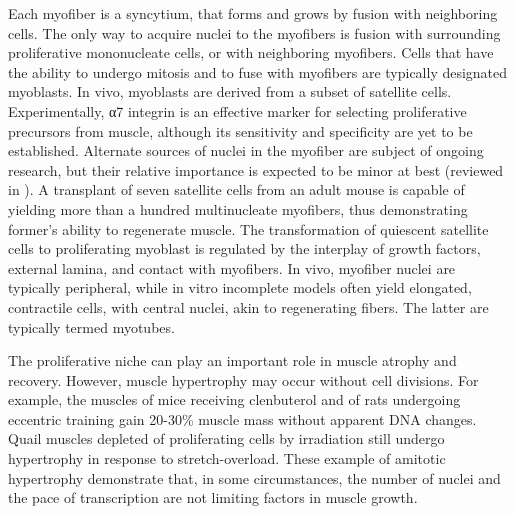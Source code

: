 \documentclass[12pt,english]{report}\usepackage[]{graphicx}\usepackage[]{color}
\begin{document}
Each myofiber is a syncytium, that forms and grows by fusion with
neighboring cells. The only way to acquire nuclei to the myofibers
is fusion with surrounding proliferative mononucleate cells, or with
neighboring myofibers. Cells that have the ability to undergo mitosis
and to fuse with myofibers are typically designated myoblasts. In
vivo, myoblasts are derived from a subset of satellite cells. Experimentally,
α7 integrin is an effective marker for selecting proliferative precursors
from muscle\citep{blanco-bose2001purification}, although its sensitivity
and specificity are yet to be established. Alternate sources of nuclei
in the myofiber are subject of ongoing research, but their relative
importance is expected to be minor at best (reviewed in \citep{yin2013satellite}).
A transplant of seven satellite cells from an adult mouse is capable
of yielding more than a hundred multinucleate myofibers, thus demonstrating
former's ability to regenerate muscle\citep{collins2005stem}. The
transformation of quiescent satellite cells to proliferating myoblast
is regulated by the interplay of growth factors, external lamina,
and contact with myofibers\citep{bischoff1986proliferation}. In vivo,
myofiber nuclei are typically peripheral, while in vitro incomplete
models often yield elongated, contractile cells, with central nuclei,
akin to regenerating fibers. The latter are typically termed myotubes.

The proliferative niche can play an important role in muscle atrophy
and recovery. However, muscle hypertrophy may occur without cell divisions.
For example, the muscles of mice receiving clenbuterol and of rats
undergoing eccentric training gain 20-30\% muscle mass without apparent
DNA changes\citep{sharma1997response,wong1990protein}. Quail muscles
depleted of proliferating cells by irradiation still undergo hypertrophy
in response to stretch-overload\citep{lowe1999stretch-induced}. These
example of amitotic hypertrophy demonstrate that, in some circumstances,
the number of nuclei and the pace of transcription are not limiting
factors in muscle growth.
\end{document}
